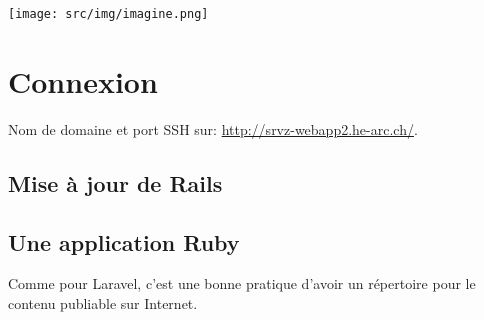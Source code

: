 \texttt{[image: src/img/imagine.png]}

\hypertarget{connexion}{%
\section{Connexion}\label{connexion}}

Nom de domaine et port SSH sur: \url{http://srvz-webapp2.he-arc.ch/}.

\begin{otherlanguage}{english}

\begin{Shaded}
\begin{Highlighting}[]

\NormalTok{$ }
\end{Highlighting}
\end{Shaded}

\end{otherlanguage}

\hypertarget{mise-uxe0-jour-de-rails}{%
\subsection{Mise à jour de Rails}\label{mise-uxe0-jour-de-rails}}

\begin{otherlanguage}{english}

\begin{Shaded}
\begin{Highlighting}[]
\end{Highlighting}
\end{Shaded}

\end{otherlanguage}

\hypertarget{une-application-ruby}{%
\subsection{Une application Ruby}\label{une-application-ruby}}

Comme pour Laravel, c'est une bonne pratique d'avoir un répertoire pour
le contenu publiable sur Internet.

